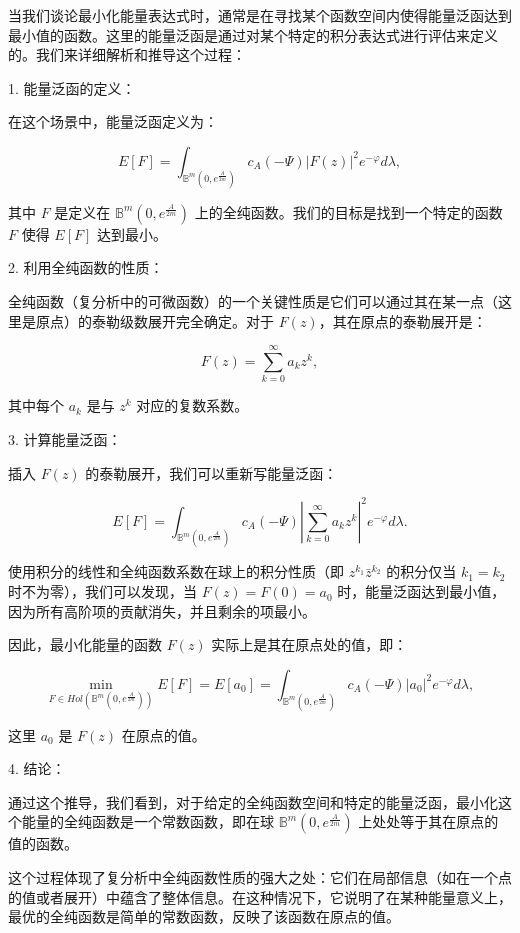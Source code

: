 \begin{remark}
当我们谈论最小化能量表达式时，通常是在寻找某个函数空间内使得能量泛函达到最小值的函数。这里的能量泛函是通过对某个特定的积分表达式进行评估来定义的。我们来详细解析和推导这个过程：

1. 能量泛函的定义： 
   
   在这个场景中，能量泛函定义为：

   $$
   E[F] = \int_{\mathbb{B}^m(0, e^{\frac{A}{2m}})} c_A(-\Psi) |F(z)|^2 e^{-\varphi} d\lambda,
   $$

   其中 $F$ 是定义在 $\mathbb{B}^m(0, e^{\frac{A}{2m}})$ 上的全纯函数。我们的目标是找到一个特定的函数 $F$ 使得 $E[F]$ 达到最小。

2. 利用全纯函数的性质：

   全纯函数（复分析中的可微函数）的一个关键性质是它们可以通过其在某一点（这里是原点）的泰勒级数展开完全确定。对于 $F(z)$，其在原点的泰勒展开是：

   $$
   F(z) = \sum_{k=0}^{\infty} a_k z^k,
   $$

   其中每个 $a_k$ 是与 $z^k$ 对应的复数系数。

3. 计算能量泛函：

   插入 $F(z)$ 的泰勒展开，我们可以重新写能量泛函：

   $$
   E[F] = \int_{\mathbb{B}^m(0, e^{\frac{A}{2m}})} c_A(-\Psi) \left|\sum_{k=0}^{\infty} a_k z^k\right|^2 e^{-\varphi} d\lambda.
   $$

   使用积分的线性和全纯函数系数在球上的积分性质（即 $z^{k_1} \bar{z}^{k_2}$ 的积分仅当 $k_1 = k_2$ 时不为零），我们可以发现，当 $F(z) = F(0) = a_0$ 时，能量泛函达到最小值，因为所有高阶项的贡献消失，并且剩余的项最小。

   因此，最小化能量的函数 $F(z)$ 实际上是其在原点处的值，即：

   $$
   \min_{F \in Hol(\mathbb{B}^{m}(0, e^{\frac{A}{2m}}))} E[F] = E[a_0] = \int_{\mathbb{B}^m(0, e^{\frac{A}{2m}})} c_A(-\Psi) |a_0|^2 e^{-\varphi} d\lambda,
   $$

   这里 $a_0$ 是 $F(z)$ 在原点的值。

4. 结论：

   通过这个推导，我们看到，对于给定的全纯函数空间和特定的能量泛函，最小化这个能量的全纯函数是一个常数函数，即在球 $\mathbb{B}^m(0, e^{\frac{A}{2m}})$ 上处处等于其在原点的值的函数。

这个过程体现了复分析中全纯函数性质的强大之处：它们在局部信息（如在一个点的值或者展开）中蕴含了整体信息。在这种情况下，它说明了在某种能量意义上，最优的全纯函数是简单的常数函数，反映了该函数在原点的值。
\end{remark}
